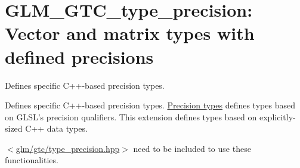 \hypertarget{group__gtc__type__precision}{\section{\-G\-L\-M\-\_\-\-G\-T\-C\-\_\-type\-\_\-precision\-: \-Vector and matrix types with defined precisions}
\label{group__gtc__type__precision}
}


\-Defines specific \-C++-\/based precision types.  


\-Defines specific \-C++-\/based precision types. \hyperlink{group__core__precision}{\-Precision types} defines types based on \-G\-L\-S\-L's precision qualifiers. \-This extension defines types based on explicitly-\/sized \-C++ data types.

$<$\hyperlink{type__precision_8hpp}{glm/gtc/type\-\_\-precision.\-hpp}$>$ need to be included to use these functionalities. 